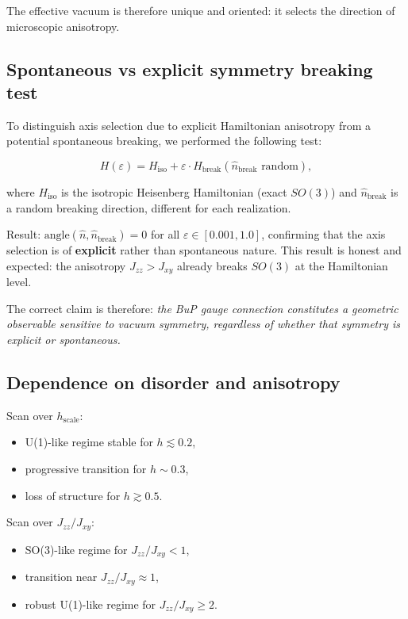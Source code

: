 \documentclass[11pt]{article}
\begin{document}
The effective vacuum is therefore unique and oriented: it selects
the direction of microscopic anisotropy.

\subsection{Spontaneous vs explicit symmetry breaking test}

To distinguish axis selection due to explicit Hamiltonian anisotropy
from a potential spontaneous breaking, we performed the following test:

\[
H(\varepsilon) = H_{\mathrm{iso}} + \varepsilon \cdot H_{\mathrm{break}}(\hat{n}_{\mathrm{break}} \text{ random}),
\]

where $H_{\mathrm{iso}}$ is the isotropic Heisenberg Hamiltonian
(exact $SO(3)$) and $\hat{n}_{\mathrm{break}}$ is a random breaking
direction, different for each realization.

Result: $\mathrm{angle}(\hat{n}, \hat{n}_{\mathrm{break}}) = 0$ for
all $\varepsilon \in [0.001, 1.0]$, confirming that the axis selection
is of \textbf{explicit} rather than spontaneous nature. This result is
honest and expected: the anisotropy $J_{zz} > J_{xy}$ already breaks
$SO(3)$ at the Hamiltonian level.

The correct claim is therefore: \textit{the BuP gauge connection
constitutes a geometric observable sensitive to vacuum symmetry,
regardless of whether that symmetry is explicit or spontaneous.}

\subsection{Dependence on disorder and anisotropy}

Scan over $h_{\mathrm{scale}}$:

\begin{itemize}
\item U(1)-like regime stable for $h \lesssim 0.2$,
\item progressive transition for $h \sim 0.3$,
\item loss of structure for $h \gtrsim 0.5$.
\end{itemize}

Scan over $J_{zz}/J_{xy}$:

\begin{itemize}
\item SO(3)-like regime for $J_{zz}/J_{xy} < 1$,
\item transition near $J_{zz}/J_{xy} \approx 1$,
\item robust U(1)-like regime for $J_{zz}/J_{xy} \geq 2$.
\end{itemize}
\end{document}
